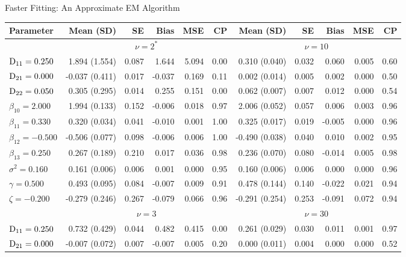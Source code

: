 \begin{chapter}{\label{cha:approx}Faster Fitting: An Approximate EM Algorithm}
  \begin{table}[t]
  \raggedleft
  \captionsetup{font=scriptsize}
  \scriptsize
  \begin{tabular}{l|rrrrr:rrrrr}
    Parameter & Mean (SD) & SE & Bias & MSE & CP & Mean (SD) & SE & Bias & MSE & CP \\ 
    \hline
    &  &  \\ 
    \hline
    $\mathrm{D}_{11} = 0.250$ &  1.894 (1.554) & 0.087 &  1.644 & 5.094 & 0.00 &  0.310 (0.040) & 0.032 &  0.060 & 0.005 & 0.60 \\ 
    $\mathrm{D}_{21} = 0.000$ & -0.037 (0.411) & 0.017 & -0.037 & 0.169 & 0.11 &  0.002 (0.014) & 0.005 &  0.002 & 0.000 & 0.50 \\ 
    $\mathrm{D}_{22} = 0.050$ &  0.305 (0.295) & 0.014 &  0.255 & 0.151 & 0.00 &  0.062 (0.007) & 0.007 &  0.012 & 0.000 & 0.54 \\ 
    $\beta_{10} = 2.000$ &  1.994 (0.133) & 0.152 & -0.006 & 0.018 & 0.97 &  2.006 (0.052) & 0.057 &  0.006 & 0.003 & 0.96 \\ 
    $\beta_{11} = 0.330$ &  0.320 (0.034) & 0.041 & -0.010 & 0.001 & 1.00 &  0.325 (0.017) & 0.019 & -0.005 & 0.000 & 0.96 \\ 
    $\beta_{12} = -0.500$ & -0.506 (0.077) & 0.098 & -0.006 & 0.006 & 1.00 & -0.490 (0.038) & 0.040 &  0.010 & 0.002 & 0.95 \\ 
    $\beta_{13} = 0.250$ &  0.267 (0.189) & 0.210 &  0.017 & 0.036 & 0.98 &  0.236 (0.070) & 0.080 & -0.014 & 0.005 & 0.98 \\ 
    $\sigma^2 = 0.160$ &  0.161 (0.006) & 0.006 &  0.001 & 0.000 & 0.95 &  0.160 (0.006) & 0.006 &  0.000 & 0.000 & 0.96 \\ 
    $\gamma = 0.500$ &  0.493 (0.095) & 0.084 & -0.007 & 0.009 & 0.91 &  0.478 (0.144) & 0.140 & -0.022 & 0.021 & 0.94 \\ 
    $\zeta = -0.200$ & -0.279 (0.246) & 0.267 & -0.079 & 0.066 & 0.96 & -0.291 (0.254) & 0.253 & -0.091 & 0.072 & 0.94 \\ 
    \hline
     &  &  \\ 
    \hline
    $\mathrm{D}_{11} = 0.250$ &  0.732 (0.429) & 0.044 &  0.482 & 0.415 & 0.00 &  0.261 (0.029) & 0.030 &  0.011 & 0.001 & 0.97 \\ 
    $\mathrm{D}_{21} = 0.000$ & -0.007 (0.072) & 0.007 & -0.007 & 0.005 & 0.20 &  0.000 (0.011) & 0.004 &  0.000 & 0.000 & 0.52 \\ 

\end{tabular}
\end{table}
\end{chapter}
